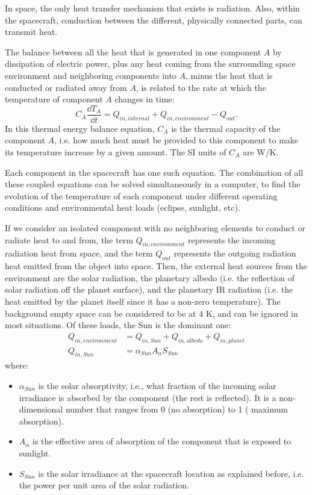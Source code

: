 In space, the only heat transfer mechanism that exists is radiation. Also,
within the spacecraft, conduction between the different, physically connected
parts, can transmit heat.

The balance between all the heat that is generated in one component $A$ by
dissipation of electric power, plus any heat coming from the surrounding space
environment and neighboring components into $A$, minus the heat that is
conducted or radiated away from $A$, is related to the rate at which the temperature of component $A$ changes in time:
%
\begin{equation}
C_A \frac{\dd T_A}{\dd t} = Q_{in,internal} + 
Q_{in,environment} - Q_{out}.
\end{equation}
%
In this thermal energy balance equation, $C_A$ is the thermal capacity of
the component $A$, i.e. how much heat must be provided to this component to 
make its temperature increase by a given amount. The SI units of $C_A$ are 
W/K.

Each component in the spacecraft has one such equation. The combination of all
these coupled equations can be solved simultaneously in a computer, to find the
evolution of the temperature of each component under different operating
conditions and environmental heat loads (eclipse, sunlight, etc).

If we consider an isolated component with no neighboring elements to conduct
or radiate heat to and from, the term $Q_{in,environment}$ represents the
incoming  radiation heat from space, and the term $Q_{out}$ represents the
outgoing radiation heat emitted from the object into space. Then, the external
heat sources from the environment are the solar radiation, the planetary
albedo (i.e. the reflection of solar radiation off the planet surface), and
the planetary IR radiation (i.e. the heat emitted by the planet itself since
it has a non-zero temperature). The background empty space can be considered 
to be at $4$ K, and can be ignored in most situations.
Of these loads, the Sun is the dominant one:
%
\begin{align}
Q_{in,environment} &= Q_{in,Sun} + Q_{in,albedo} + Q_{in,planet}
\\
Q_{in,Sun} &= \alpha_{Sun} A_\alpha S_{Sun}
\end{align}
%
where: 
%
\begin{itemize}
\item $\alpha_{Sun}$ is the solar absorptivity, i.e., what fraction of the 
incoming solar irradiance is absorbed by the component (the rest is reflected).
It is a non-dimensional number that ranges from 0 (no absorption) to 1 (
maximum absorption).
\item $A_\alpha$ is the effective area of absorption of the component that is 
exposed to sunlight.
\item $S_{Sun}$ is the solar irradiance at the spacecraft location as explained before, i.e. the 
power per unit area of the solar radiation. 
\end{itemize}
%

